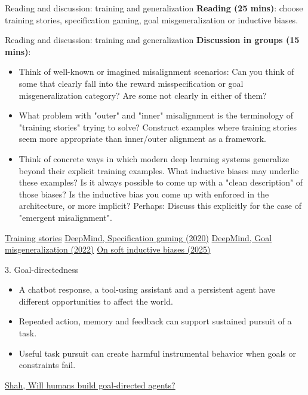 \documentclass[aspectratio=169,11pt]{beamer}
\newcommand{\sources}[1]{\vfill{\fontsize{6.3}{7.5}\selectfont\color{muted}#1\par}}
\begin{document}
\begin{frame}[t,label=trainingexercise]{Reading and discussion: training and generalization}
\textbf{Reading (25 mins)}: choose training stories, specification gaming, goal misgeneralization or inductive biases.
\end{frame}

\begin{frame}[t,label=trainingexercise]{Reading and discussion: training and generalization}
\textbf{Discussion in groups (15 mins)}:
\begin{itemize}
\item Think of well-known or imagined misalignment scenarios: Can you think of some that clearly fall into the reward misspecification or goal misgeneralization category? Are some not clearly in either of them?
\item What problem with "outer" and "inner" misalignment is the terminology of "training stories" trying to solve? Construct examples where training stories seem more appropriate than inner/outer alignment as a framework.
\item Think of concrete ways in which modern deep learning systems generalize beyond their explicit training examples. What inductive biases may underlie these examples? Is it always possible to come up with a "clean description" of those biases? Is the inductive bias you come up with enforced in the architecture, or more implicit? Perhaps: Discuss this explicitly for the case of "emergent misalignment".
\end{itemize}
\sources{\href{https://www.alignmentforum.org/posts/FDJnZt8Ks2djouQTZ/how-do-we-become-confident-in-the-safety-of-a-machine}{Training stories} \quad \href{https://deepmind.google/blog/specification-gaming-the-flip-side-of-ai-ingenuity/}{DeepMind, Specification gaming (2020)} \quad \href{https://deepmind.google/blog/how-undesired-goals-can-arise-with-correct-rewards/}{DeepMind, Goal misgeneralization (2022)} \quad \href{https://arxiv.org/abs/2503.02113}{On soft inductive biases (2025)}}
\end{frame}


\begin{frame}[t,label=agency]{3. Goal-directedness}
\begin{itemize}\setlength{\itemsep}{3.5mm}
\item A chatbot response, a tool-using assistant and a persistent agent have different opportunities to affect the world.
\item Repeated action, memory and feedback can support sustained pursuit of a task.
\item Useful task pursuit can create harmful instrumental behavior when goals or constraints fail.
\end{itemize}
\sources{\href{https://www.alignmentforum.org/posts/9zpT9dikrrebdq3Jf/will-humans-build-goal-directed-agents}{Shah, Will humans build goal-directed agents?}}
\end{frame}
\end{document}

